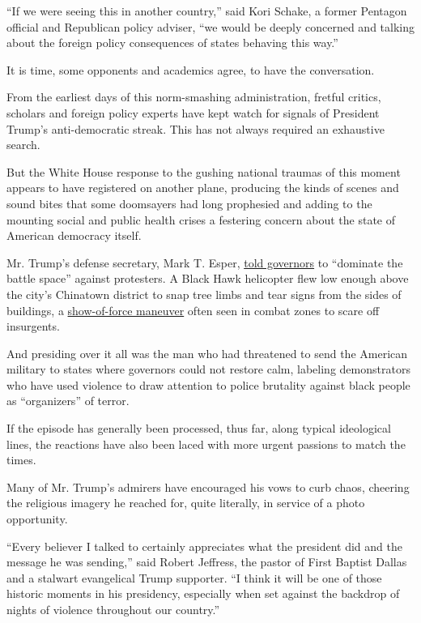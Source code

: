 ``If we were seeing this in another country,'' said Kori Schake, a
former Pentagon official and Republican policy adviser, ``we would be
deeply concerned and talking about the foreign policy consequences of
states behaving this way.''

It is time, some opponents and academics agree, to have the
conversation.

From the earliest days of this norm-smashing administration, fretful
critics, scholars and foreign policy experts have kept watch for signals
of President Trump's anti-democratic streak. This has not always
required an exhaustive search.

But the White House response to the gushing national traumas of this
moment appears to have registered on another plane, producing the kinds
of scenes and sound bites that some doomsayers had long prophesied and
adding to the mounting social and public health crises a festering
concern about the state of American democracy itself.

Mr. Trump's defense secretary, Mark T. Esper,
\href{https://www.nytimes.com/2020/06/01/us/politics/police-military-gear.html}{told
governors} to ``dominate the battle space'' against protesters. A Black
Hawk helicopter flew low enough above the city's Chinatown district to
snap tree limbs and tear signs from the sides of buildings, a
\href{https://www.nytimes.com/2020/06/02/us/politics/military-national-guard-trump-protests.html}{show-of-force
maneuver} often seen in combat zones to scare off insurgents.

And presiding over it all was the man who had threatened to send the
American military to states where governors could not restore calm,
labeling demonstrators who have used violence to draw attention to
police brutality against black people as ``organizers'' of terror.

If the episode has generally been processed, thus far, along typical
ideological lines, the reactions have also been laced with more urgent
passions to match the times.

Many of Mr. Trump's admirers have encouraged his vows to curb chaos,
cheering the religious imagery he reached for, quite literally, in
service of a photo opportunity.

``Every believer I talked to certainly appreciates what the president
did and the message he was sending,'' said Robert Jeffress, the pastor
of First Baptist Dallas and a stalwart evangelical Trump supporter. ``I
think it will be one of those historic moments in his presidency,
especially when set against the backdrop of nights of violence
throughout our country.''

